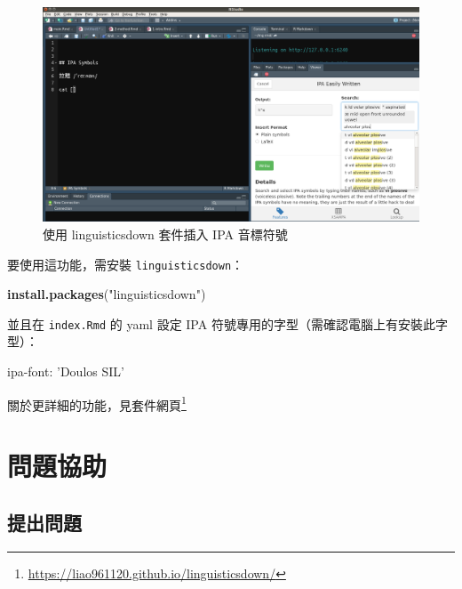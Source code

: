 \documentclass[oneside]{book}
\newenvironment{Shaded}{\begin{snugshade}}{\end{snugshade}}
\newcommand{\KeywordTok}[1]{\textcolor[rgb]{0.13,0.29,0.53}{\textbf{#1}}}
\newcommand{\StringTok}[1]{\textcolor[rgb]{0.31,0.60,0.02}{#1}}
\newcommand{\FunctionTok}[1]{\textcolor[rgb]{0.00,0.00,0.00}{#1}}
\newcommand{\AttributeTok}[1]{\textcolor[rgb]{0.77,0.63,0.00}{#1}}
\newcommand{\NormalTok}[1]{#1}
\renewcommand{\href}[2]{#2\footnote{\url{#1}}}
\theoremstyle{definition}
\theoremstyle{definition}
\theoremstyle{definition}
\theoremstyle{remark}
\begin{document}
\begin{figure}[H]

{\centering \includegraphics[width=1\linewidth]{figs/ipa} 

}

\caption{使用 linguisticsdown 套件插入 IPA 音標符號}\label{fig:unnamed-chunk-9}
\end{figure}

要使用這功能，需安裝 \texttt{linguisticsdown}：

\begin{Shaded}
\begin{Highlighting}[]
\KeywordTok{install.packages}\NormalTok{(}\StringTok{"linguisticsdown"}\NormalTok{)}
\end{Highlighting}
\end{Shaded}

並且在 \texttt{index.Rmd} 的 yaml 設定 IPA
符號專用的字型（需確認電腦上有安裝此字型）：

\begin{Shaded}
\begin{Highlighting}[]
\FunctionTok{ipa-font:}\AttributeTok{ }\StringTok{'Doulos SIL'}
\end{Highlighting}
\end{Shaded}

關於更詳細的功能，見\href{https://liao961120.github.io/linguisticsdown/}{套件網頁}

\chapter*{問題協助}\label{feed-back}

\hypertarget{issue}{\section*{提出問題}\label{issue}}
\end{document}

